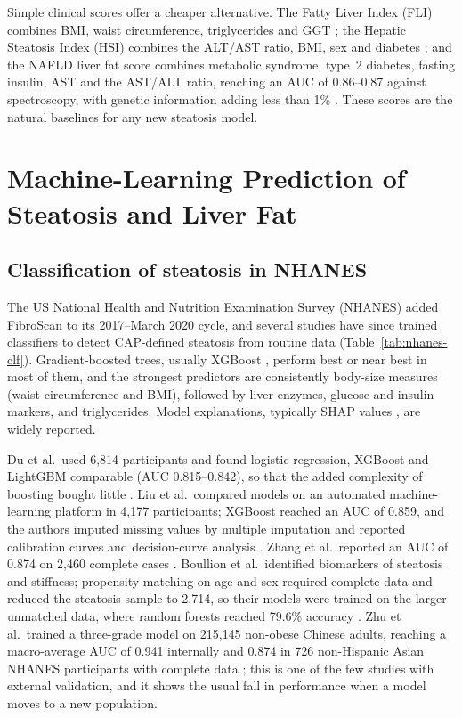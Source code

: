 Simple clinical scores offer a cheaper alternative. The Fatty Liver Index (FLI) combines BMI, waist circumference, triglycerides and GGT \cite{bedogni2006fli}; the Hepatic Steatosis Index (HSI) combines the ALT/AST ratio, BMI, sex and diabetes \cite{lee2010hsi}; and the NAFLD liver fat score combines metabolic syndrome, type~2 diabetes, fasting insulin, AST and the AST/ALT ratio, reaching an AUC of 0.86--0.87 against spectroscopy, with genetic information adding less than 1\% \cite{kotronen2009prediction}. These scores are the natural baselines for any new steatosis model.

\section{Machine-Learning Prediction of Steatosis and Liver Fat}
\label{sec:lr-ml}

\subsection{Classification of steatosis in NHANES}

The US National Health and Nutrition Examination Survey (NHANES) added FibroScan to its 2017--March 2020 cycle, and several studies have since trained classifiers to detect CAP-defined steatosis from routine data (Table~\ref{tab:nhanes-clf}). Gradient-boosted trees, usually XGBoost \cite{chen2016xgboost}, perform best or near best in most of them, and the strongest predictors are consistently body-size measures (waist circumference and BMI), followed by liver enzymes, glucose and insulin markers, and triglycerides. Model explanations, typically SHAP values \cite{lundberg2017shap}, are widely reported.

Du et al.\ used 6,814 participants and found logistic regression, XGBoost and LightGBM comparable (AUC 0.815--0.842), so that the added complexity of boosting bought little \cite{du2026masld}. Liu et al.\ compared models on an automated machine-learning platform in 4,177 participants; XGBoost reached an AUC of 0.859, and the authors imputed missing values by multiple imputation and reported calibration curves and decision-curve analysis \cite{liu2024automl}. Zhang et al.\ reported an AUC of 0.874 on 2,460 complete cases \cite{zhang2025masld}. Boullion et al.\ identified biomarkers of steatosis and stiffness; propensity matching on age and sex required complete data and reduced the steatosis sample to 2,714, so their models were trained on the larger unmatched data, where random forests reached 79.6\% accuracy \cite{boullion2025biomarker}. Zhu et al.\ trained a three-grade model on 215,145 non-obese Chinese adults, reaching a macro-average AUC of 0.941 internally and 0.874 in 726 non-Hispanic Asian NHANES participants with complete data \cite{zhu2026nonobese}; this is one of the few studies with external validation, and it shows the usual fall in performance when a model moves to a new population.

